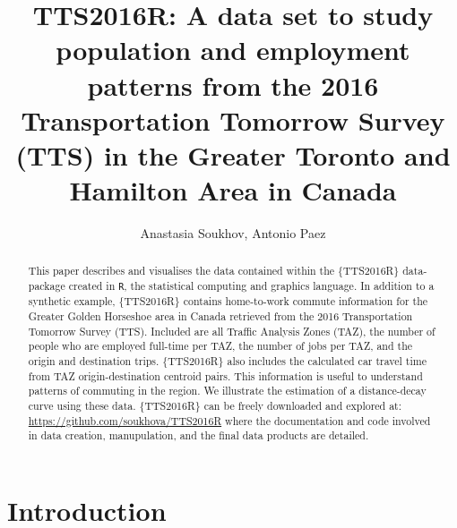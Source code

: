 \documentclass[Royal,times,sageh]{sagej}
\begin{document}

\title{TTS2016R: A data set to study population and employment patterns
from the 2016 Transportation Tomorrow Survey (TTS) in the Greater
Toronto and Hamilton Area in Canada}

\runninghead{}

\author{Anastasia Soukhov\affilnum{}, Antonio Paez\affilnum{}}

\affiliation{\affilnum{}{}}



\begin{abstract}
This paper describes and visualises the data contained within the
\{TTS2016R\} data-package created in \texttt{R}, the statistical
computing and graphics language. In addition to a synthetic example,
\{TTS2016R\} contains home-to-work commute information for the Greater
Golden Horseshoe area in Canada retrieved from the 2016 Transportation
Tomorrow Survey (TTS). Included are all Traffic Analysis Zones (TAZ),
the number of people who are employed full-time per TAZ, the number of
jobs per TAZ, and the origin and destination trips. \{TTS2016R\} also
includes the calculated car travel time from TAZ origin-destination
centroid pairs. This information is useful to understand patterns of
commuting in the region. We illustrate the estimation of a
distance-decay curve using these data. \{TTS2016R\} can be freely
downloaded and explored at: \url{https://github.com/soukhova/TTS2016R}
where the documentation and code involved in data creation,
manupulation, and the final data products are detailed.
\end{abstract}


\maketitle

\hypertarget{introduction}{%
\section{Introduction}\label{introduction}}
\end{document}
